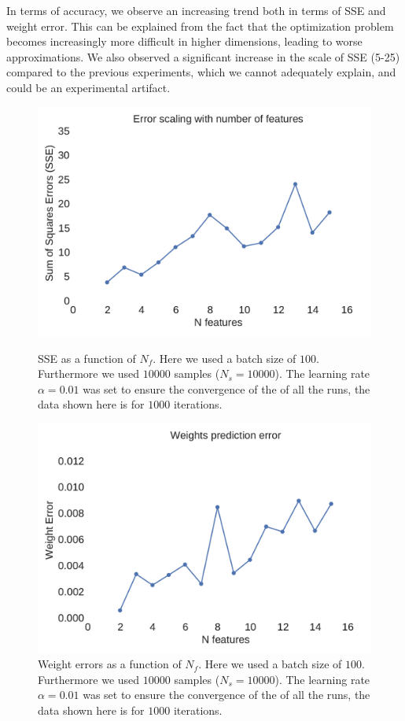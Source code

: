 \documentclass[11pt,a4paper]{article}
\begin{document}
In terms of accuracy, we observe an increasing trend both in terms of SSE and weight
error. This can be explained from the fact that the optimization problem becomes increasingly
more difficult in higher dimensions, leading to worse approximations. We also observed
a significant increase in the scale of SSE (5-25) compared to the previous experiments,
which we cannot adequately explain, and could be an experimental artifact.

\begin{figure}[H]
	\centering
  \includegraphics[width=\linewidth]{errors_n_features.pdf}
  \caption{SSE as a function of $N_f$. Here we used a batch size of $100$. Furthermore we used $10000$ samples ($N_s=10000$). The learning rate $\alpha=0.01$ was set to ensure the convergence of the of all the runs, the data shown here is for $1000$ iterations.}
  \label{fig:n_features_error}
\endminipage
\hfill
{}
  \includegraphics[width=\linewidth]{weights_errors_n_features.pdf}
  \caption{Weight errors as a function of $N_f$. Here we used a batch size of $100$. Furthermore we used $10000$ samples ($N_s=10000$). The learning rate $\alpha=0.01$ was set to ensure the convergence of the of all the runs, the data shown here is for $1000$ iterations.}
  \label{fig:n_features_weights_error}
\endminipage
\end{figure}
\end{document}
